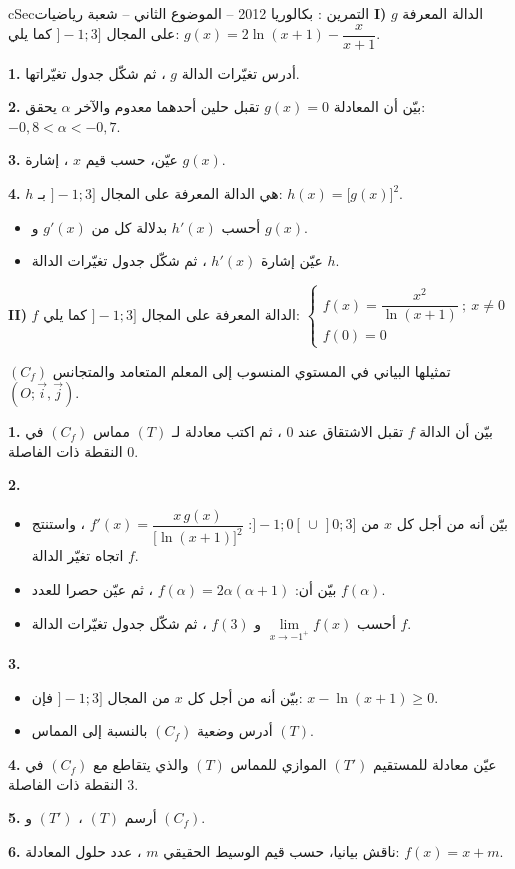\documentclass[12pt,a4paper]{article}
\newenvironment{BOX}[2]{\begin{otherlanguage}{english}\begin{arbox}{#1}{#2}}{\end{arbox}\end{otherlanguage}}
\newcounter{exo}
\newenvironment{tamrin}[1]{\stepcounter{exo}\begin{BOX}{cSec}{التمرين \theexo: #1}}{\end{BOX}}
\newenvironment{sq}{\begin{itemize}[leftmargin=2.4em,itemsep=3pt]}{\end{itemize}}
\newcommand{\qa}{\item[(أ)]}\newcommand{\qb}{\item[(ب)]}\newcommand{\qc}{\item[(جـ)]}\newcommand{\qd}{\item[(د)]}\newcommand{\qe}{\item[(هـ)]}
\newcommand{\QQ}[1]{\par\smallskip\textbf{#1.} }
\begin{document}
\begin{tamrin}{بكالوريا 2012 -- الموضوع الثاني -- شعبة رياضيات}
\textbf{I)} $g$ الدالة المعرفة على المجال $]-1;3]$ كما يلي: $g(x)=2\ln(x+1)-\dfrac{x}{x+1}$.
\QQ{1} أدرس تغيّرات الدالة $g$ ، ثم شكّل جدول تغيّراتها.
\QQ{2} بيّن أن المعادلة $g(x)=0$ تقبل حلين أحدهما معدوم والآخر $\alpha$ يحقق: $-0{,}8<\alpha<-0{,}7$.
\QQ{3} عيّن، حسب قيم $x$ ، إشارة $g(x)$.
\QQ{4} $h$ هي الدالة المعرفة على المجال $]-1;3]$ بـ: $h(x)=\big[g(x)\big]^2$.
\begin{sq}
\qa أحسب $h'(x)$ بدلالة كل من $g'(x)$ و $g(x)$.
\qb عيّن إشارة $h'(x)$ ، ثم شكّل جدول تغيّرات الدالة $h$.
\end{sq}

\textbf{II)} $f$ الدالة المعرفة على المجال $]-1;3]$ كما يلي:
$\begin{cases} f(x)=\dfrac{x^2}{\ln(x+1)}\ ;\ x\neq0\\[4pt] f(0)=0\end{cases}$

$(C_f)$ تمثيلها البياني في المستوي المنسوب إلى المعلم المتعامد والمتجانس $(O;\vec i,\vec j)$.
\QQ{1} بيّن أن الدالة $f$ تقبل الاشتقاق عند $0$ ، ثم اكتب معادلة لـ $(T)$ مماس $(C_f)$ في النقطة ذات الفاصلة $0$.
\QQ{2}
\begin{sq}
\qa بيّن أنه من أجل كل $x$ من $]-1;0[\,\cup\,]0;3]$: $f'(x)=\dfrac{x\,g(x)}{\big[\ln(x+1)\big]^2}$ ، واستنتج اتجاه تغيّر الدالة $f$.
\qb بيّن أن: $f(\alpha)=2\alpha(\alpha+1)$ ، ثم عيّن حصرا للعدد $f(\alpha)$.
\qc أحسب $\lim\limits_{x\to-1^{+}}f(x)$ و $f(3)$ ، ثم شكّل جدول تغيّرات الدالة $f$.
\end{sq}
\QQ{3}
\begin{sq}
\qa بيّن أنه من أجل كل $x$ من المجال $]-1;3]$ فإن: $x-\ln(x+1)\geq0$.
\qb أدرس وضعية $(C_f)$ بالنسبة إلى المماس $(T)$.
\end{sq}
\QQ{4} عيّن معادلة للمستقيم $(T')$ الموازي للمماس $(T)$ والذي يتقاطع مع $(C_f)$ في النقطة ذات الفاصلة $3$.
\QQ{5} أرسم $(T)$ ، $(T')$ و $(C_f)$.
\QQ{6} ناقش بيانيا، حسب قيم الوسيط الحقيقي $m$ ، عدد حلول المعادلة: $f(x)=x+m$.
\end{tamrin}
\end{document}
